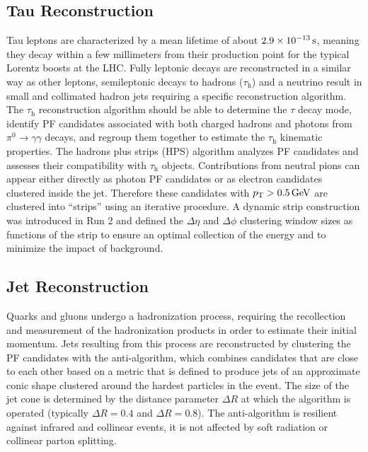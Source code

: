 \subsection{Tau Reconstruction}
\label{sec:tau_reco}
Tau leptons are characterized by a mean lifetime of about $2.9 \times \text{10}^\text{$-$13}\,\text{s}$, meaning they decay within a few millimeters from their production point for the typical Lorentz boosts at the LHC.
Fully leptonic decays are reconstructed in a similar way as other leptons, semileptonic decays to hadrons ($\tau_\text{h}$) and a neutrino result in small and collimated hadron jets requiring a specific reconstruction algorithm.
The $\tau_\text{h}$ reconstruction algorithm should be able to determine the $\tau$ decay mode, identify PF candidates associated with both charged hadrons and photons from $\pi^0 \rightarrow \gamma\gamma$ decays, and regroup them together to estimate the $\tau_\text{h}$ kinematic properties.
The hadrons plus strips (HPS) algorithm
analyzes PF candidates and assesses their compatibility with $\tau_\text{h}$ objects.
Contributions from neutral pions can appear either directly as photon PF candidates or as electron candidates clustered inside the jet.
Therefore these candidates with $p_{\mathrm{T}} > 0.5\,\text{Ge\hspace{-.08em}V}$ are clustered into ``strips'' using an iterative procedure.
A dynamic strip construction was introduced in Run 2 and defined the $\Delta\eta$ and $\Delta\phi$ clustering window sizes as functions of the strip \pT to ensure an optimal collection of the energy and to minimize the impact of background.

\subsection{Jet Reconstruction}
\label{sec:jet_reco}
Quarks and gluons undergo a hadronization process, requiring the recollection and measurement of the hadronization products in order to estimate their initial momentum.
Jets resulting from this process are reconstructed by clustering the PF candidates with the anti-\kt algorithm,
which combines candidates that are close to each other based on a metric that is defined to produce jets of an approximate conic shape clustered around the hardest particles in the event.
The size of the jet cone is determined by the distance parameter $\Delta R$ at which the algorithm is operated (typically $\Delta R = 0.4$ and $ \Delta R = 0.8$).
The anti-\kt algorithm is resilient against infrared and collinear events, \ie it is not affected by soft radiation or collinear parton splitting. 

